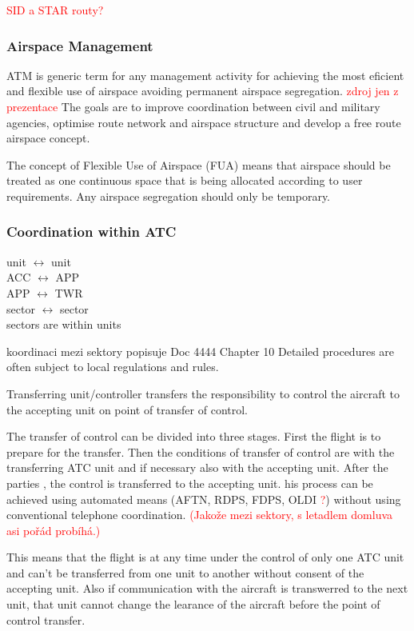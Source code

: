 \textcolor{red}{SID a STAR routy?}

\subsubsection{Airspace Management}
ATM is generic term for any management activity for achieving the most eficient and flexible use of airspace avoiding permanent airspace segregation. \textcolor{red}{zdroj jen z prezentace}
The goals are to improve coordination between civil and military agencies, optimise route network and airspace structure and develop a free route airspace concept.

The concept of Flexible Use of Airspace (FUA) means that airspace should be treated as one continuous space that is being allocated according to user requirements. Any airspace segregation should only be temporary.

\subsubsection{Coordination within ATC}
unit $\leftrightarrow$ unit \\
ACC $\leftrightarrow$ APP \\
APP $\leftrightarrow$ TWR \\
sector $\leftrightarrow$ sector \\
sectors are within units

koordinaci mezi sektory popisuje \cite{doc4444} Doc 4444 Chapter 10
Detailed procedures are often subject to local regulations and rules.

Transferring unit/controller transfers the responsibility to control the aircraft to the accepting unit on point of transfer of control.

The transfer of control can be divided into three stages. First the flight is  to prepare for the transfer. Then the conditions of transfer of control are  with the transferring ATC unit and if necessary also with the accepting unit. After the parties , the control is transferred to the accepting unit. his process can be achieved using automated means (AFTN, RDPS, FDPS, OLDI \textcolor{red}{?}) without using conventional telephone coordination. \textcolor{red}{(Jakože mezi sektory, s letadlem domluva asi pořád probíhá.)} \cite[Chapter 10.1.1]{doc4444}

This means that the flight is at any time under the control of only one ATC unit and can't be transferred from one unit to another without consent of the accepting unit. Also if communication with the aircraft is transwerred to the next unit, that unit cannot change the learance of the aircraft before the point of control transfer.


